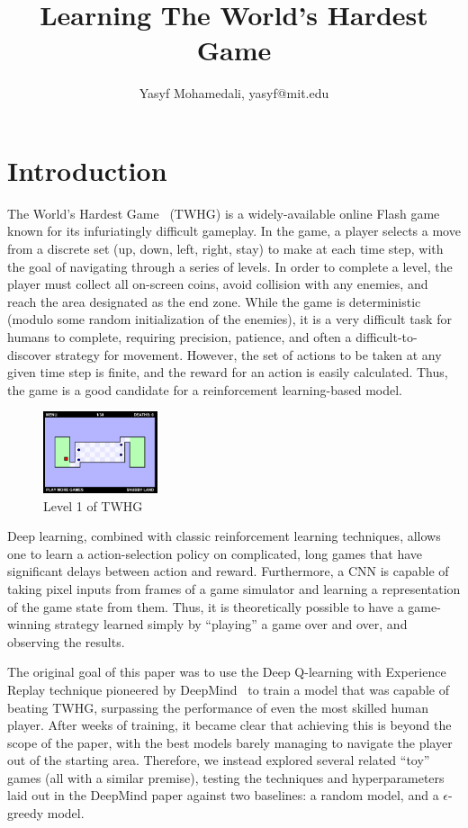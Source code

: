 \documentclass[9pt,journal]{IEEEtran}
\begin{document}
\title{Learning The World's Hardest Game}
\author{Yasyf Mohamedali, yasyf@mit.edu}
\maketitle

\section{Introduction}

The World's Hardest Game~\cite{game} (TWHG) is a widely-available online Flash game known for its infuriatingly difficult gameplay. In the game, a player selects a move from a discrete set (up, down, left, right, stay) to make at each time step, with the goal of navigating through a series of levels. In order to complete a level, the player must collect all on-screen coins, avoid collision with any enemies, and reach the area designated as the end zone. While the game is deterministic (modulo some random initialization of the enemies), it is a very difficult task for humans to complete, requiring precision, patience, and often a difficult-to-discover strategy for movement. However, the set of actions to be taken at any given time step is finite, and the reward for an action is easily calculated. Thus, the game is a good candidate for a reinforcement learning-based model.

\begin{figure}[ht]
  \includegraphics[width=0.3\textwidth]{report/hardest_game}
  \centering
  \caption{Level 1 of TWHG}
  \label{fig:twhg}
\end{figure}

Deep learning, combined with classic reinforcement learning techniques, allows one to learn a action-selection policy on complicated, long games that have significant delays between action and reward. Furthermore, a CNN is capable of taking pixel inputs from frames of a game simulator and learning a representation of the game state from them. Thus, it is theoretically possible to have a game-winning strategy learned simply by ``playing'' a game over and over, and observing the results.

The original goal of this paper was to use the Deep Q-learning with Experience Replay technique pioneered by DeepMind~\cite{deepmind} to train a model that was capable of beating TWHG, surpassing the performance of even the most skilled human player. After weeks of training, it became clear that achieving this is beyond the scope of the paper, with the best models barely managing to navigate the player out of the starting area. Therefore, we instead explored several related ``toy'' games (all with a similar premise), testing the techniques and hyperparameters laid out in the DeepMind paper against two baselines: a random model, and a $\epsilon$-greedy model.
\end{document}
